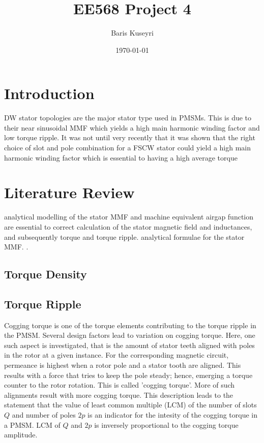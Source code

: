 \documentclass [a4 paper, 11pt, titlepage] {article}
\begin{document}
	\title{EE568 Project 4}
	\author{Baris Kuseyri}
	\date{\today}
	\maketitle
	
	\tableofcontents
	\newpage
	
	\section{Introduction}

	DW stator topologies are the major stator type used in PMSMs. This is due to their near sinusoidal MMF which yields a high main harmonic winding factor and low torque ripple. It was not until very recently that it was shown that the right choice of slot and pole combination for a FSCW stator could yield a high main harmonic winding factor which is essential to having a high average torque \cite{farshadnia_advanced_2018}












	\section{Literature Review}
	analytical modelling of the stator MMF and machine equivalent airgap function are essential to correct calculation of the stator magnetic field and inductances, and subsequently torque and torque ripple. analytical formulae for the stator MMF. \cite{farshadnia_advanced_2018}.
	
	\subsection{Torque Density}
	
	\subsection{Torque Ripple}
	
	Cogging torque is one of the torque elements contributing to the torque ripple in the PMSM. Several design factors lead to variation on cogging torque. Here, one such aspect is investigated, that is the amount of stator teeth aligned with poles in the rotor at a given instance. For the corresponding magnetic circuit, permeance is highest when a rotor pole and a stator tooth are aligned. This results with a force that tries to keep the pole steady; hence, emerging a torque counter to the rotor rotation. This is called 'cogging torque'. More of such alignments result with more cogging torque. This description leads to the statement that the value of least common multiple (LCM) of the number of slots $Q$ and number of poles $2p$ is an indicator for the intesity of the cogging torque in a PMSM. LCM of $Q$ and $2p$ is inversely proportional to the cogging torque amplitude. 
	
\end{document}
